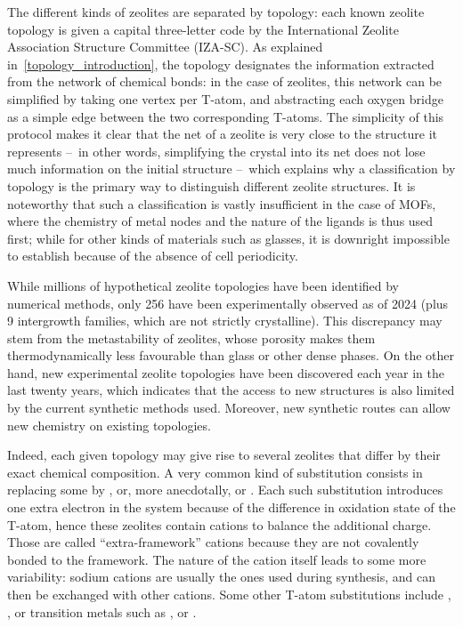 \documentclass[main.tex]{subfiles}
\begin{document}
The different kinds of zeolites are separated by topology: each known zeolite topology is given a capital three-letter code by the International Zeolite Association Structure Committee (IZA-SC). As explained in~\cref{topology_introduction}, the topology designates the information extracted from the network of chemical bonds: in the case of zeolites, this network can be simplified by taking one vertex per T-atom, and abstracting each oxygen bridge as a simple edge between the two corresponding T-atoms. The simplicity of this protocol makes it clear that the net of a zeolite is very close to the structure it represents --~in other words, simplifying the crystal into its net does not lose much information on the initial structure --~which explains why a classification by topology is the primary way to distinguish different zeolite structures. It is noteworthy that such a classification is vastly insufficient in the case of MOFs, where the chemistry of metal nodes and the nature of the ligands is thus used first; while for other kinds of materials such as glasses, it is downright impossible to establish because of the absence of cell periodicity.

While millions of hypothetical zeolite topologies have been identified by numerical methods\autocite{Deem}, only 256 have been experimentally observed as of 2024 (plus 9 intergrowth families, which are not strictly crystalline). This discrepancy may stem from the metastability of zeolites, whose porosity makes them thermodynamically less favourable than glass or other dense phases\autocite{ZeoliteStability}. On the other hand, new experimental zeolite topologies have been discovered each year in the last twenty years, which indicates that the access to new structures is also limited by the current synthetic methods used. Moreover, new synthetic routes can allow new chemistry on existing topologies\autocite{ZeoliteSynthesisReviewJihong,ZeoliteSynthesisUnconventionalDusselier}.

Indeed, each given topology may give rise to several zeolites that differ by their exact chemical composition. A very common kind of substitution consists in replacing some  by , or, more anecdotally, \autocite{BoronZeolites} or \autocite{GalliumZeolites}. Each such substitution introduces one extra electron in the system because of the difference in oxidation state of the T-atom, hence these zeolites contain cations to balance the additional charge. Those are called ``extra-framework'' cations because they are not covalently bonded to the framework. The nature of the cation itself leads to some more variability: sodium cations are usually the ones used during synthesis, and can then be exchanged with other cations\autocite{CationExchangeZeolites,CationsFAUReview}. Some other T-atom substitutions include \autocite{GermaniumZeolites}, \autocite{TinZeolites}, or transition metals such as ,  or \autocite{ExoticZeoliteComposition,TinZeolites}.
\end{document}
